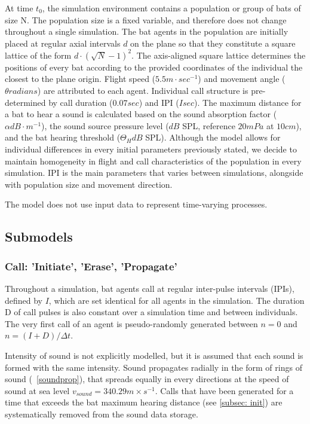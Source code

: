 \documentclass[12pt]{article}
\begin{document}
At time $t_0$, the simulation environment contains a population or group of bats of size N. The population size is a fixed variable, and therefore does not change throughout a single simulation. The bat agents in the population are initially placed at regular axial intervals $d$ on the plane so that they constitute a square lattice of the form $d\cdot (\sqrt{N}-1)^2$. The axis-aligned square lattice determines the positions of every bat according to the provided coordinates of the individual the closest to the plane origin. Flight speed ($5.5 m\cdot sec^{-1}$) and movement angle ($\theta radians$) are attributed to each agent. Individual call structure is pre-determined by call duration ($0.07 sec$) and IPI ($I sec$). The maximum distance for a bat to hear a sound is calculated based on the sound absorption factor ($\alpha dB\cdot m^{-1}$), the sound source pressure level ($dB$ SPL, reference $20 mPa$ at $10 cm$), and the bat hearing threshold ($\Theta_H dB$ SPL).
Although the model allows for individual differences in every initial parameters previously stated, we decide to maintain homogeneity in flight and call characteristics of the population in every simulation. IPI is the main parameters that varies between simulations, alongside with population size and movement direction.  

The model does not use input data to represent time-varying processes.

\subsection{Submodels}

\subsubsection{Call: 'Initiate', 'Erase', 'Propagate'}
Throughout a simulation, bat agents call at regular inter-pulse intervals (IPIs), defined by $I$, which are set identical for all agents in the simulation. The duration D of call pulses is also constant over a simulation time and between individuals. 
The very first call of an agent is pseudo-randomly generated between $n=0$ and $n=(I + D)/\Delta t$. 

Intensity of sound is not explicitly modelled, but it is assumed that each sound is formed with the same intensity. Sound propagates radially in the form of rings of sound (~\ref{soundprop}), that spreads equally in every directions at the speed of sound at sea level $v_{sound}=340.29 m\times s^{-1}$. Calls that have been generated for a time that exceeds the bat maximum hearing distance (see \ref{subsec: init}) are systematically removed from the sound data storage. 
\end{document}
